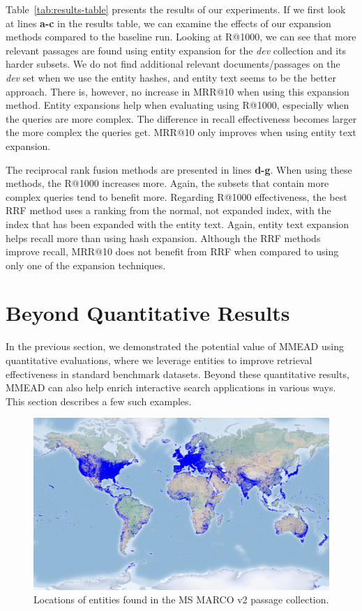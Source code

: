 Table~\ref{tab:results-table} presents the results of our experiments. If we first look at lines \textbf{a-c} in the results table, we can examine the effects of our expansion methods compared to the baseline run. Looking at R@1000, we can see that more relevant passages are found using entity expansion for the \emph{dev} collection and its harder subsets. We do not find additional relevant documents/passages on the \emph{dev} set when we use the entity hashes, and entity text seems to be the better approach. There is, however, no increase in MRR@10 when using this expansion method. Entity expansions help when evaluating using R@1000, especially when the queries are more complex. The difference in recall effectiveness becomes larger the more complex the queries get. MRR@10 only improves when using entity text expansion.

The reciprocal rank fusion methods are presented in lines \textbf{d-g}. When using these methods, the R@1000 increases more. Again, the subsets that contain more complex queries tend to benefit more. Regarding R@1000 effectiveness, the best RRF method uses a ranking from the normal, not expanded index, with the index that has been expanded with the entity text. Again, entity text expansion helps recall more than using hash expansion. Although the RRF methods improve recall, MRR@10 does not benefit from RRF when compared to using only one of the expansion techniques. 

\section{Beyond Quantitative Results}
In the previous section, we demonstrated the potential value of MMEAD using quantitative evaluations, where we leverage entities to improve retrieval effectiveness in standard benchmark datasets.
Beyond these quantitative results, MMEAD can also help enrich interactive search applications in various ways.
This section describes a few such examples.

\begin{figure}
	\centering
	\includegraphics[width=.9\textwidth]{imgs/basemap_shaded_blue_opa.png}
	\caption{Locations of entities found in the MS MARCO v2 passage collection.}
	\label{fig:entity_map}
\end{figure}

